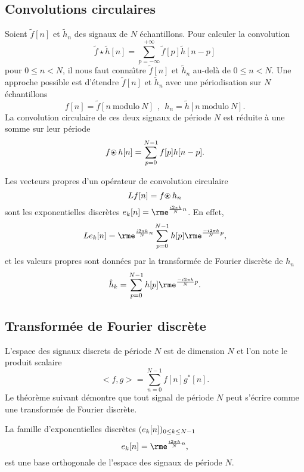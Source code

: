 \subsection{Convolutions circulaires}

Soient $\tilde f[n]$ et $\tilde h_n$ des signaux de $N$
\'echantillons.
Pour calculer la convolution
\[
\tilde f \star \tilde h [n] = \sum_{p=-\infty}^{+\infty}
\tilde f[p] \tilde h[n-p]
\]
pour $0 \leq n < N$, il nous faut conna\^{\i}tre
$\tilde f[n]$ et $\tilde h_n$ au-del\`a de $0 \leq n < N$.
Une approche possible est d'\'etendre
$\tilde f[n]$ et $\tilde h_n$ avec une p\'eriodisation
sur $N$ \'echantillons
\[
f[n] =  \tilde f[n ~\mbox{modulo}~ N]
~~,~~
h_n =  \tilde h[n ~\mbox{modulo}~ N] .
\]
La convolution circulaire de ces deux signaux de p\'eriode $N$
est r\'eduite \`a une somme sur leur p\'eriode
\[
f {\mbox{$\odot \!\!\!\!\star~$}} h [n]
= \sum_{p=0}^{N-1}
f[p] h[n-p] .
\]

Les vecteurs propres d'un op\'erateur de convolution circulaire
\[
Lf[n] = f {\mbox{$\odot \!\!\!\!\star~$}} h_n
\]
sont les exponentielles discr\`etes
$e_k[n] = \rme^{ \frac {i2 \pi k} N n  }$.
En effet,
\[
L e_k [n] = \rme^{ \frac {i2 \pi k} N n  }
\sum_{p=0}^{N-1}
h[p]  \rme^{ \frac {-i2 \pi k} N p  },
\]
et les valeurs propres sont donn\'ees par la
transform\'ee de Fourier discr\`ete de $h_n$
\[
\hat h_k = \sum_{p=0}^{N-1}
h[p]  \rme^{ \frac {-i2 \pi k} N p  } .
\]

\subsection{Transform\'ee de Fourier discr\`ete}
\label{transf-four-discr}

L'espace des signaux discrets
de p\'eriode $N$ est de dimension $N$ et l'on note le produit
scalaire
\begin{equation}
\label{inn-prod}
<f,g> = \sum_{n=0} ^{N-1} f[n]  g^*[n] .
\end{equation}
Le th\'eor\`eme suivant d\'emontre que tout signal
de p\'eriode $N$ peut s'\'ecrire comme une transform\'ee de
Fourier discr\`ete.

\begin{theorem}
La famille d'exponentielles discr\`etes
$(e_k[n])_{ 0 \leq k \leq N-1}$
\begin{equation}
e_k[n] = \rme^{ \frac {i2 \pi k} N n  },
\end{equation}
est une base orthogonale de l'espace des signaux
de p\'eriode $N$.
\end{theorem}

